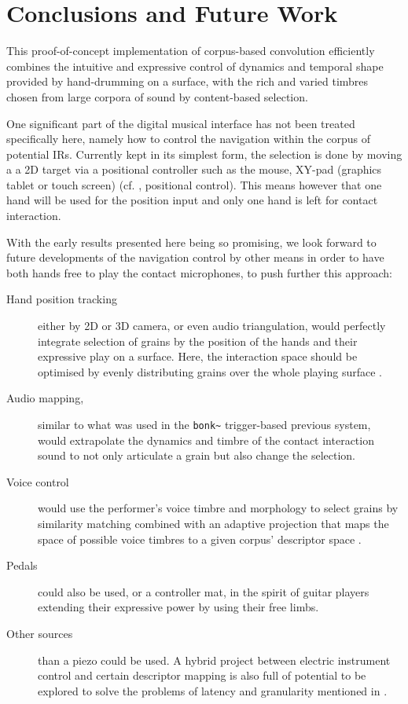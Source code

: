 \section{Conclusions and Future Work}\label{sec:future}

This proof-of-concept implementation of corpus-based convolution efficiently combines the intuitive and expressive control of dynamics and temporal shape provided by hand-drumming on a surface, with the rich and varied timbres chosen from large corpora of sound by content-based selection.


One significant part of the digital musical interface has not been treated specifically here, namely how to control the navigation within the corpus of potential IRs. Currently kept in its simplest form, the selection is done by moving a a 2D target via a positional controller such as the mouse, XY-pad (graphics tablet or touch screen) (cf. \cite{Schwarz-nime2012-sound-space}, positional control).
This means however that one hand will be used for the position input and only one hand is left for contact interaction.

With the early results presented here being so promising, we look forward to future developments of the navigation control by other means in order to have both hands free to play the contact microphones, to push further this approach:

\begin{description}
\item[Hand position tracking] either by 2D or 3D camera, or even audio triangulation, would perfectly integrate selection of grains by the position of the hands and their expressive play on a surface.  Here, the interaction space should be optimised by evenly distributing grains over the whole playing surface \cite{LallemandSchwarz-dafx2011-distribute}.
\item[Audio mapping,] similar to what was used in the \verb|bonk~| trigger-based previous system, would extrapolate the dynamics and timbre of the contact interaction sound to not only articulate a grain but also change the selection.
\item[Voice control] would use the performer's voice timbre and morphology to select grains by similarity matching combined with an adaptive projection that maps the space of possible voice timbres to a given corpus' descriptor space \cite{StowellPlumbley-smc2010-timbre-remapping-regression-tree,Fasciani-si2013b}.
\item[Pedals] could also be used, or a controller mat, in the spirit of guitar players extending their expressive power by using their free limbs.
\item[Other sources] than a piezo could be used. A hybrid project between electric instrument control and certain descriptor mapping is also full of potential to be explored to solve the problems of latency and granularity mentioned in \cite{TremblaySchwarz-nime2010-surfing-the-waves}.
\end{description}

